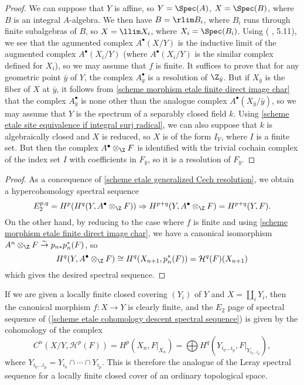 \begin{proof}
We can suppose that $Y$ is affine, so $Y=\Spec(A)$, $X=\Spec(B)$, where $B$ is an integral $A$-algebra. We then have $B=\rlim B_i$, where $B_i$ runs through finite subalgebras of $B$, so $X=\llim X_i$, where $X_i=\Spec(B_i)$. Using (\cite{SGA4-2} , 5.11), we see that the agumented complex $A^\bullet(X/Y)$ is the inductive limit of the augmented complex $A^\bullet(X_i/Y)$ (where $A^\bullet(X_i/Y)$ is the similar complex defined for $X_i$), so we may assume that $f$ is finite. It suffices to prove that for any geometric point $\bar{y}$ of $Y$, the complex $A_{\bar{y}}^\bullet$ is a resolution of $\Z_{\bar{y}}$. But if $X_{\bar{y}}$ is the fiber of $X$ at $\bar{y}$, it follows from \cref{scheme morphism etale finite direct image char} that the complex $A^\bullet_{\bar{y}}$ is none other than the analogue complex $A^\bullet(X_{\bar{y}}/\bar{y})$, so we may assume that $Y$ is the spectrum of a separably closed field $k$. Using \cref{scheme etale site equivalence if integral surj radical}, we can also suppose that $k$ is algebraically closed and $X$ is reduced, so $X$ is of the form $I_Y$, where $I$ is a finite set. But then the complex $A^\bullet\otimes_\Z F$ is identified with the trivial cochain complex of the index set $I$ with coefficients in $F_{\bar{y}}$, so it is a resolution of $F_{\bar{y}}$.
\end{proof}
\begin{proof}
As a concequence of \cref{scheme etale generalized Cech resolution}, we obtain a hypercohomology spectral sequence
\[E_2^{p,q}=H^p(H^q(Y,A^\bullet\otimes_{\Z}F))\Rightarrow H^{p+q}(Y,A^\bullet\otimes_{\Z}F)=H^{p+q}(Y,F).\]
On the other hand, by reducing to the case where $f$ is finite and using \cref{scheme morphism etale finite direct image char}, we have a canonical isomorphism $A^n\otimes_{\Z}F\stackrel{\sim}{\to}p_{n*}p_n^*(F)$, so
\[H^q(Y,A^\bullet\otimes_{\Z}F)\cong H^q(X_{n+1},p_n^*(F))=\mathcal{H}^q(F)(X_{n+1})\]
which gives the desired spectral sequence.
\end{proof}

\begin{remark}
If we are given a locally finite closed covering $(Y_i)$ of $Y$ and $X=\coprod_iY_i$, then the canonical morphism $f:X\to Y$ is clearly finite, and the $E_2$ page of spectral sequence of (\ref{scheme etale cohomology descent spectral sequence}) is given by the cohomology of the complex
\[C^n(X/Y,\mathcal{H}^p(F))=H^p(X_n,F|_{X_n})=\bigoplus H^q(Y_{i_0\dots i_p},F|_{Y_{i_0\dots i_p}}),\]
where $Y_{i_0\dots i_p}=Y_{i_0}\cap\cdots\cap Y_{i_p}$. This is therefore the analogue of the Leray spectral sequence for a locally finite closed cover of an ordinary topological space.
\end{remark}

